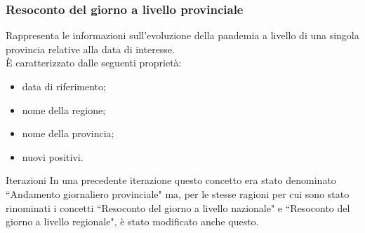 \subsubsection{Resoconto del giorno a livello provinciale}
\label{sss:resoconto-del-giorno-livello-provinciale}
Rappresenta le informazioni sull'evoluzione della pandemia a livello di una singola provincia relative alla data di interesse.\\
È caratterizzato dalle seguenti proprietà:
\begin{itemize}
    \item data di riferimento;
    \item nome della regione;
    \item nome della provincia;
    \item nuovi positivi.
\end{itemize}
\begin{bclogo}{Iterazioni}
In una precedente iterazione questo concetto era stato denominato ``Andamento giornaliero provinciale" ma, per le stesse ragioni per cui sono stato rinominati i concetti ``Resoconto del giorno a livello nazionale" e ``Resoconto del giorno a livello regionale", è stato modificato anche questo.
\end{bclogo}

